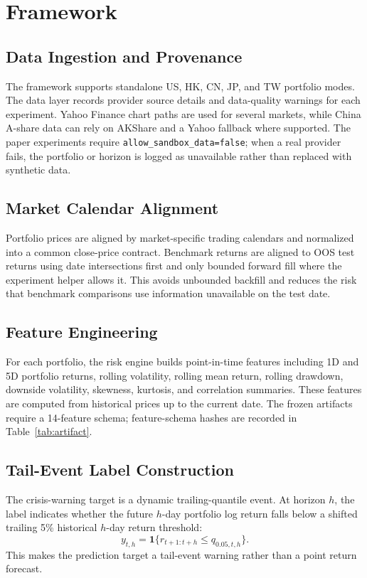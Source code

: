 \documentclass{ieeeaccess}
\begin{document}
\section{Framework}
\label{sec:framework}

\subsection{Data Ingestion and Provenance}
The framework supports standalone US, HK, CN, JP, and TW portfolio modes. The data layer records provider source details and data-quality warnings for each experiment. Yahoo Finance chart paths are used for several markets, while China A-share data can rely on AKShare and a Yahoo fallback where supported. The paper experiments require \texttt{allow\_sandbox\_data=false}; when a real provider fails, the portfolio or horizon is logged as unavailable rather than replaced with synthetic data.

\subsection{Market Calendar Alignment}
Portfolio prices are aligned by market-specific trading calendars and normalized into a common close-price contract. Benchmark returns are aligned to OOS test returns using date intersections first and only bounded forward fill where the experiment helper allows it. This avoids unbounded backfill and reduces the risk that benchmark comparisons use information unavailable on the test date.

\subsection{Feature Engineering}
For each portfolio, the risk engine builds point-in-time features including 1D and 5D portfolio returns, rolling volatility, rolling mean return, rolling drawdown, downside volatility, skewness, kurtosis, and correlation summaries. These features are computed from historical prices up to the current date. The frozen artifacts require a 14-feature schema; feature-schema hashes are recorded in Table~\ref{tab:artifact}.

\subsection{Tail-Event Label Construction}
The crisis-warning target is a dynamic trailing-quantile event. At horizon $h$, the label indicates whether the future $h$-day portfolio log return falls below a shifted trailing 5\% historical $h$-day return threshold:
\begin{equation}
y_{t,h}=\mathbf{1}\{r_{t+1:t+h}\leq q_{0.05,t,h}\}.
\end{equation}
This makes the prediction target a tail-event warning rather than a point return forecast.
\end{document}
